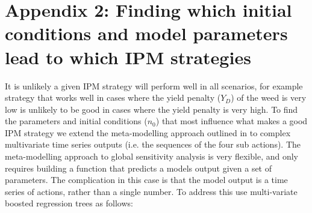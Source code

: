 \documentclass[12pt, a4paper]{article}
\begin{document}
\section*{Appendix 2: Finding which initial conditions and model parameters lead to which IPM strategies}
It is unlikely a given IPM strategy will perform well in all scenarios, for example strategy that works well in cases where the yield penalty ($Y_D$) of the weed is very low is unlikely to be good in cases where the yield penalty is very high. To find the parameters and initial conditions ($n_0$) that most influence what makes a good IPM strategy we extend the meta-modelling approach outlined in \citep{Cout2014} to complex multivariate time series outputs (i.e. the sequences of the four sub actions). The meta-modelling approach to global sensitivity analysis is very flexible, and only requires building a function that predicts a models output given a set of parameters. The complication in this case is that the model output is a time series of actions, rather than a single number. To address this use multi-variate boosted regression trees\citep{Mill2016} as follows:
\end{document}
